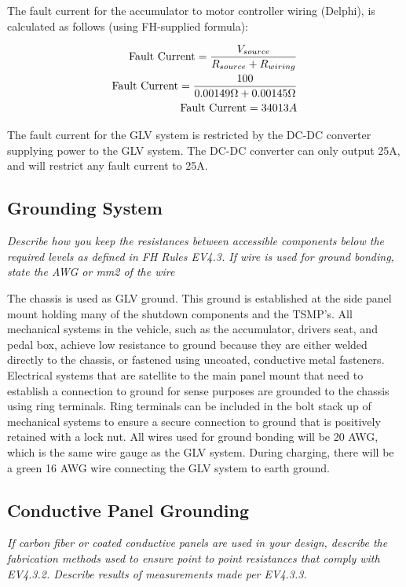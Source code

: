 \documentclass{article}
\begin{document}
The fault current for the accumulator to motor controller wiring (Delphi), is calculated as follows (using FH-supplied formula):

\begin{align}
    \text{Fault Current} = \dfrac{V_{source}}{R_{source} + R_{wiring}}\\
    \text{Fault Current} = \dfrac{100}{0.00149 \ohm + 0.00145 \ohm}\\
    \text{Fault Current} = 34013 A
\end{align}

The fault current for the GLV system is restricted by the DC-DC converter supplying power to the GLV system. The DC-DC converter can only output 25A, and will restrict any fault current to 25A.

\subsection{Grounding System}

\textit{Describe how you keep the resistances between accessible components below the required levels as defined in FH Rules EV4.3. If wire is used for ground bonding, state the AWG or mm2 of the wire}

The chassis is used as GLV ground. This ground is established at the side panel mount holding many of the shutdown components and the TSMP's. All mechanical systems in the vehicle, such as the accumulator, drivers seat, and pedal box, achieve low resistance to ground because they are either welded directly to the chassis, or fastened using uncoated, conductive metal fasteners. Electrical systems that are satellite to the main panel mount that need to establish a connection to ground for sense purposes are grounded to the chassis using ring terminals. Ring terminals can be included in the bolt stack up of mechanical systems to ensure a secure connection to ground that is positively retained with a lock nut. All wires used for ground bonding will be 20 AWG, which is the same wire gauge as the GLV system. During charging, there will be a green 16 AWG wire connecting the GLV system to earth ground.

\subsection{Conductive Panel Grounding}

\textit{If carbon fiber or coated conductive panels are used in your design, describe the fabrication methods used to ensure point to point resistances that comply with EV4.3.2. Describe results of measurements made per EV4.3.3.}
\end{document}

